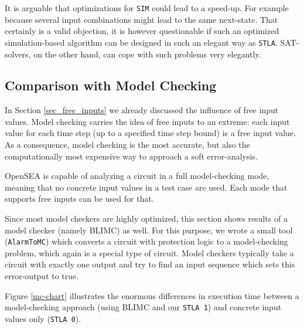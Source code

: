 \documentclass[a4paper,10pt]{article}
\begin{document}
It is arguable that optimizations for \texttt{SIM} could lead to a speed-up. For example because several input combinations
might lead to the same next-state. That certainly is a valid objection, it is however questionable if such an optimized simulation-based algorithm can be designed in such an elegant way as \texttt{STLA}. 
SAT-solvers, on the other hand, can cope with such problems very elegantly.


\subsection{Comparison with Model Checking}
In Section \ref{sec_free_inputs} we already discussed the influence of free input values. 
Model checking carries the idea of free inputs to an extreme: each input value for each time step (up to a specified time step bound) is a free input value. 
As a consequence, model checking is the most accurate, but also the computationally most expensive way to approach a soft error-analysis.

OpenSEA is capable of analyzing a circuit in a full model-checking mode, meaning that no concrete input values in a test case are used. 
Each mode that supports free inputs can be used for that.

Since most model checkers are highly optimized, this section shows results of a model checker (namely BLIMC) as well.
For this purpose, we wrote a small tool (\texttt{AlarmToMC}) which converts a circuit with protection logic to a model-checking problem, which again is a special type of circuit.
Model checkers typically take a circuit with exactly one output and try to find an input sequence which sets this error-output to true. 


Figure \ref{mc-chart} illustrates the enormous differences in execution time between a model-checking approach (using BLIMC and our \texttt{STLA 1}) and concrete input values only (\texttt{STLA 0}).
\end{document}
